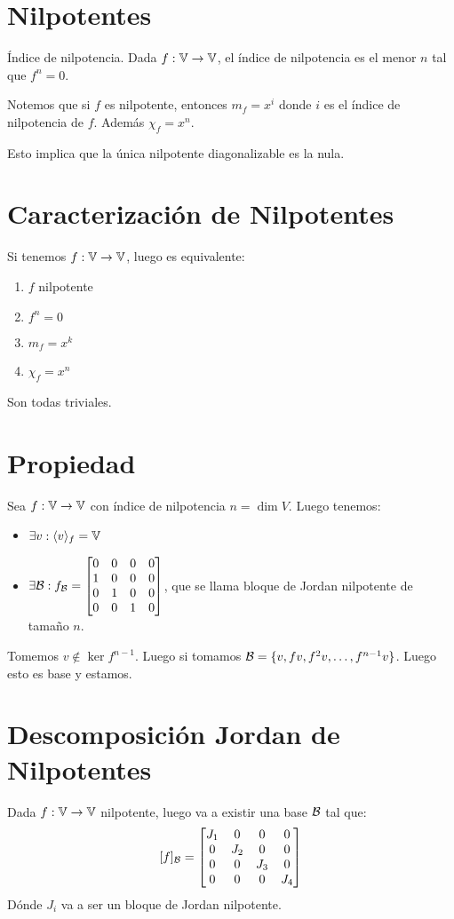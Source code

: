\documentclass{article}
\begin{document}
\section*{Nilpotentes}
Índice de nilpotencia. Dada $f : \mathbb{V} \to \mathbb{V}$, el índice de nilpotencia es el menor $n$ tal que $f^n = 0$.

Notemos que si $f$ es nilpotente, entonces $m_f = x^i$ donde $i$ es el índice de nilpotencia de $f$. Además $\chi_f = x^n$.

Esto implica que la única nilpotente diagonalizable es la nula.

\section*{Caracterización de Nilpotentes}
Si tenemos $f : \mathbb{V} \to \mathbb{V}$, luego es equivalente:
\begin{enumerate}
	\item $f$ nilpotente
	\item $f^n = 0$
	\item $m_f = x^k$
	\item $\chi_f = x^n$
\end{enumerate}
Son todas triviales.

\section*{Propiedad}
Sea $f : \mathbb{V} \to \mathbb{V}$ con índice de nilpotencia $n = \dim V$. Luego tenemos:
\begin{itemize}
	\item $\exists v : \langle v \rangle_f = \mathbb{V}$
	\item $\exists \mathcal{B} : f_{\mathcal{B}} = 
		\begin{bmatrix}
			0 & 0 & 0 & 0 \\
			1 & 0 & 0 & 0 \\
			0 & 1 & 0 & 0 \\
			0 & 0 & 1 & 0 \\
		\end{bmatrix}$, que se llama bloque de Jordan nilpotente de tamaño $n$.
\end{itemize}
Tomemos $v \notin \ker f^{n-1}$. Luego si tomamos $\mathcal{B} = \{v, fv, f^2v, \dots, f^{n-1}v\}$. Luego esto es base y estamos.

\section*{Descomposición Jordan de Nilpotentes}
Dada $f : \mathbb{V} \to \mathbb{V}$ nilpotente, luego va a existir una base $\mathcal{B}$ tal que:
\[
	[f]_{\mathcal{B}} = 
	\begin{bmatrix}
		J_1 & 0 & 0 & 0 \\
		0 & J_2 & 0 & 0 \\
		0 & 0 & J_3 & 0 \\
		0 & 0 & 0 & J_4 \\
	\end{bmatrix}
\]
Dónde $J_i$ va a ser un bloque de Jordan nilpotente.
\end{document}
